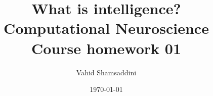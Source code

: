 \documentclass[%
 reprint,
 amsmath,amssymb,
 aps,
]{revtex4-2}
\begin{document}
\title{What is intelligence? \\
\footnotesize Computational Neuroscience Course homework 01}%

\author{Vahid Shamsaddini}



\date{\today}%




\maketitle


\end{document}
